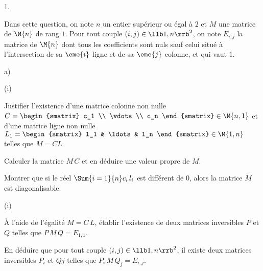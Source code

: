 \documentclass[11pt]{article}%
\begin{document}
\begin{noliste}{1.}
\item Dans cette question, on note $n$ un entier supérieur ou égal à
  $2$ et $M$ une matrice de $\M{n}$ de rang $1$. Pour tout couple $(i,
  j) \in \llb 1, n \rrb^2$, on note $E_{i, j}$ la matrice de $\M{n}$
  dont tous les coefficients sont nuls sauf celui situé à
  l'intersection de sa $\eme{i}$ ligne et de sa $\eme{j}$ colonne, et
  qui vaut $1$.
  \begin{noliste}{a)}
    \setlength{\itemsep}{2mm} %
  \item
    \begin{nonoliste}{(i)}
      \setlength{\itemsep}{2mm} %
    \item Justifier l'existence d'une matrice colonne non nulle $C =
      \begin{smatrix}
        c_1 \\
        \vdots \\
        c_n
      \end{smatrix}
      \in \M{n, 1}$ et d'une matrice ligne non nulle $
      L_1 = 
      \begin{smatrix}
        l_1 & \ldots & l_n
      \end{smatrix}
      \in \M{1, n}
      $ telles que $M = CL$.

    \item Calculer la matrice $M \, C$ et en déduire une valeur propre
      de $M$.

    \item Montrer que si le réel $\Sum{i=1}{n} c_i \, l_i$ est
      différent de $0$, alors la matrice $M$ est diagonalisable.
    \end{nonoliste}

  \item
    \begin{nonoliste}{(i)}
      \setlength{\itemsep}{2mm} %
    \item À l'aide de l'égalité $M = C \, L$, établir l'existence de
      deux matrices inversibles $P$ et $Q$ telles que $P \, M \, Q =
      E_{1, 1}$.

    \item En déduire que pour tout couple $(i, j) \in \llb 1,
      n\rrb^2$, il existe deux matrices inversibles $P_i$ et $Qj$
      telles que $P_i \, M \, Q_j = E_{i, j}$.
    \end{nonoliste}
    
  \end{noliste}
\end{noliste}


\end{document}
